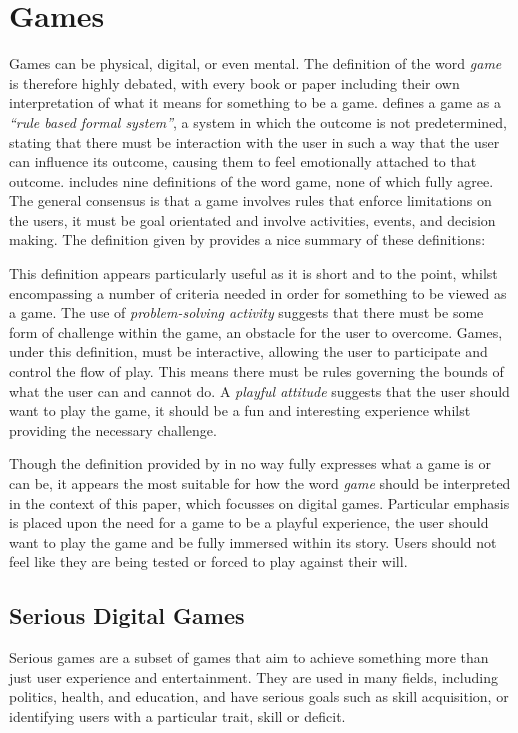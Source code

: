 \documentclass[journal]{IEEEtran}
\begin{document}
\section{Games}
\label{sec:games}
Games can be physical, digital, or even mental. The definition of the word \emph{game} is therefore highly debated, with every book or paper including their own interpretation of what it means for something to be a game. \cite{halfReal} defines a game as a \emph{``rule based formal system''}, a system in which the outcome is not predetermined, stating that there must be interaction with the user in such a way that the user can influence its outcome, causing them to feel emotionally attached to that outcome. \cite{rulesOfPlay} includes nine definitions of the word game, none of which fully agree. The general consensus is that a game involves rules that enforce limitations on the users, it must be goal orientated and involve activities, events, and decision making. The definition given by \cite{artOfGameDesign} provides a nice summary of these definitions: 

This definition appears particularly useful as it is short and to the point, whilst encompassing a number of criteria needed in order for something to be viewed as a game. The use of \textit{problem-solving activity} suggests that there must be some form of challenge within the game, an obstacle for the user to overcome. Games, under this definition, must be interactive, allowing the user to participate and control the flow of play. This means there must be rules governing the bounds of what the user can and cannot do. A \textit{playful attitude} suggests that the user should want to play the game, it should be a fun and interesting experience whilst providing the necessary challenge.

Though the definition provided by \cite{artOfGameDesign} in no way fully expresses what a game is or can be, it appears the most suitable for how the word \emph{game} should be interpreted in the context of this paper, which focusses on digital games. Particular emphasis is placed upon the need for a game to be a playful experience, the user should want to play the game and be fully immersed within its story. Users should not feel like they are being tested or forced to play against their will.

\subsection{Serious Digital Games}
Serious games are a subset of games that aim to achieve something more than just user experience and entertainment\cite{stegeserious}. They are used in many fields, including politics, health, and education, and have serious goals such as skill acquisition, or identifying users with a particular trait, skill or deficit\cite{SeriousOverview}.
 
\end{document}
